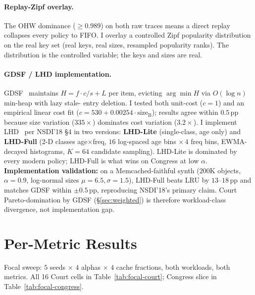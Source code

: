 \documentclass[letterpaper,twocolumn,10pt]{article}
\begin{document}
\paragraph{Replay-Zipf overlay.} The OHW dominance ($\geq 0.989$) on
both raw traces means a direct replay collapses every policy to FIFO.
I overlay a controlled Zipf popularity distribution on the real key
set (real keys, real sizes, resampled popularity ranks). The
distribution is the controlled variable; the keys and sizes are real.

\paragraph{GDSF / LHD implementation.}
GDSF~\cite{cherkasova1998gdsf} maintains $H = f \cdot c / s + L$ per
item, evicting $\arg\min H$ via $O(\log n)$ min-heap with lazy stale-
entry deletion. I tested both unit-cost ($c=1$) and an empirical
linear cost fit ($c = 530 + 0.00254 \cdot \text{size}_{\text{B}}$);
results agree within $0.5$\,pp because size variation ($335\times$)
dominates cost variation ($3.2\times$). I implement
LHD~\cite{beckmann2018lhd} per NSDI'18 \S 4 in two versions:
\textbf{LHD-Lite} (single-class, age only) and \textbf{LHD-Full}
(2-D classes age$\times$freq, $16$ log-spaced age bins $\times\,4$
freq bins, EWMA-decayed histograms, $K=64$ candidate sampling).
LHD-Lite is dominated by every modern policy; LHD-Full is what wins
on Congress at low $\alpha$. \textbf{Implementation validation:} on
a Memcached-faithful synth ($200$K objects, $\alpha=0.9$, log-normal
sizes $\mu=6.5,\sigma=1.5$), LHD-Full beats LRU by $13$--$18$\,pp
and matches GDSF within $\pm 0.5$\,pp, reproducing NSDI'18's primary
claim. Court Pareto-domination by GDSF (\S\ref{sec:weighted}) is
therefore workload-class divergence, not implementation gap.

\section{Per-Metric Results}\label{sec:gdsf}

Focal sweep: $5$ seeds $\times$ $4$ alphas $\times$ $4$ cache fractions,
both workloads, both metrics. All 16 Court cells in
Table~\ref{tab:focal-court}; Congress slice in
Table~\ref{tab:focal-congress}.
\end{document}
